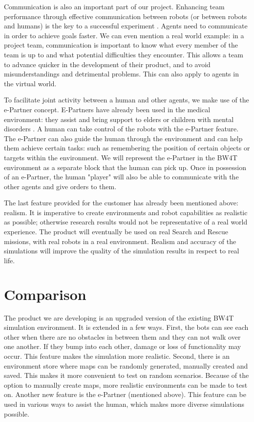 \documentclass[oneside]{tudelft-report}
\begin{document}
Communication is also an important part of our project. Enhancing team performance through effective communication between robots (or between robots and humans) is the key to a successful experiment \cite{communication}. Agents need to communicate in order to achieve goals faster. We can even mention a real world example: in a project team, communication is important to know what every member of the team is up to and what potential difficulties they encounter. This allows a team to advance quicker in the development of their product, and to avoid misunderstandings and detrimental problems. This can also apply to agents in the virtual world. 

To facilitate joint activity between a human and other agents, we make use of the e-Partner concept. E-Partners have already been used in the medical environment: they assist and bring support to elders or children with mental disorders \cite{Pelsmaeker}. A human can take control of the robots with the e-Partner feature. The e-Partner can also guide the human through the environment and can help them achieve certain tasks: such as remembering the position of certain objects or targets within the environment. We will represent the e-Partner in the BW4T environment as a separate block that the human can pick up. Once in possession of an e-Partner, the human "player" will also be able to communicate with the other agents and give orders to them.

The last feature provided for the customer has already been mentioned above: realism. It is imperative to create environments and robot capabilities as realistic as possible; otherwise research results would not be representative of a real world experience. The product will eventually be used on real Search and Rescue missions, with real robots in a real environment. Realism and accuracy of the simulations will improve the quality of the simulation results in respect to real life. 

\chapter{Comparison}
The product we are developing is an upgraded version of the existing BW4T simulation environment. It is extended in a few ways. First, the bots can see each other when there are no obstacles in between them and they can not walk over one another. If they bump into each other, damage or loss of functionality may occur. This feature makes the simulation more realistic. Second, there is an environment store where maps can be randomly generated, manually created and saved. This makes it more convenient to test on random scenarios. Because of the option to manually create maps, more realistic environments can be made to test on. Another new feature is the e-Partner (mentioned above). This feature can be used in various ways to assist the human, which makes more diverse simulations possible.
\end{document}
